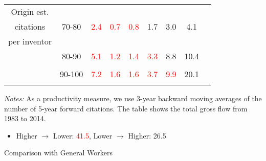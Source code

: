 \documentclass{beamer}
\begin{document}
{\begin{table}[t]
\begin{center}
\begin{tabular}{ccccccccc
        }
        Origin est.                                                    &                                                             &                      &                      &                      &                      &                      &          \\
        citations                                                      & 70-80                                                       & \textcolor{red}{2.4} & \textcolor{red}{0.7} & \textcolor{red}{0.8} & 1.7                  & 3.0                  & 4.1      \\
        per inventor                                                   &                                                             &                      &                      &                      &                      &                      &          \\
                                                                       & 80-90                                                       & \textcolor{red}{5.1} & \textcolor{red}{1.2} & \textcolor{red}{1.4} & \textcolor{red}{3.3} & 8.8                  & 10.4     \\
                                                                       &                                                             &                      &                      &                      &                      &                      &          \\
                                                                       & 90-100                                                      & \textcolor{red}{7.2} & \textcolor{red}{1.6} & \textcolor{red}{1.6} & \textcolor{red}{3.7} & \textcolor{red}{9.9} & 20.1     \\
        \\\hline
      \end{tabular}
    \end{center}
    \vspace{0.05in}
    \footnotesize{\tiny\textit{Notes:} As a productivity measure, we use 3-year backward moving averages of the number of 5-year forward citations. The table shows the total gross flow from 1983 to 2014. }
  \end{table}
  \begin{itemize}
    \item Higher $\rightarrow$ Lower: \textcolor{red}{41.5}, Lower $\rightarrow$ Higher: 26.5
  \end{itemize}
}


\begin{frame}{}
  \centering
  {\LARGE Comparison with General Workers}
\end{frame}
\end{document}
